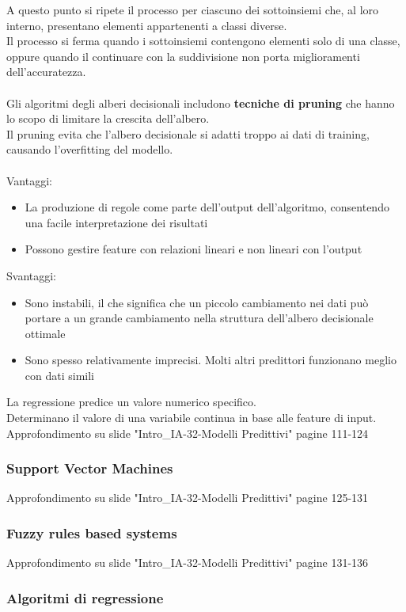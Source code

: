 \documentclass[../main.tex]{subfiles}
\begin{document}
	A questo punto si ripete il processo per ciascuno dei sottoinsiemi che, al loro interno, presentano elementi appartenenti a classi diverse. \\
	Il processo si ferma quando i sottoinsiemi contengono elementi solo di una classe, oppure quando il continuare con la suddivisione non porta miglioramenti dell'accuratezza.\\\\
	Gli algoritmi degli alberi decisionali includono \textbf{tecniche di pruning} che hanno lo scopo di limitare la crescita dell'albero.\\
	Il pruning evita che l'albero decisionale si adatti troppo ai dati di training, causando l'overfitting del modello.\\\\
	Vantaggi:
	\begin{itemize}
		\item La produzione di regole come parte dell'output dell'algoritmo, consentendo una facile interpretazione dei risultati
		\item Possono gestire feature con relazioni lineari e non lineari con l'output
	\end{itemize}
	Svantaggi:
	\begin{itemize}
		\item Sono instabili, il che significa che un piccolo cambiamento nei dati può portare a un grande cambiamento nella struttura dell'albero decisionale ottimale
		\item Sono spesso relativamente imprecisi. Molti altri predittori funzionano meglio con dati simili
	\end{itemize}
	La regressione predice un valore numerico specifico.\\ Determinano il valore di una variabile continua in base alle feature di input.\\
	{\color{red}Approfondimento su slide "Intro\_IA-32-Modelli Predittivi" pagine 111-124}
	\subsubsection{Support Vector Machines}
	{\color{red}Approfondimento su slide "Intro\_IA-32-Modelli Predittivi" pagine 125-131}
	\subsubsection{Fuzzy rules based systems}
	{\color{red}Approfondimento su slide "Intro\_IA-32-Modelli Predittivi" pagine 131-136}
	\subsubsection{Algoritmi di regressione}
\end{document}
